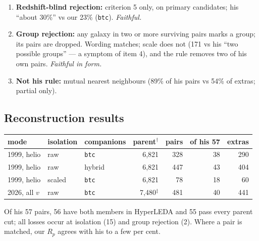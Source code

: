 \documentclass[11pt]{article}
\begin{document}
\begin{enumerate}
        textually supported choice and the funnel-faithful one
        (blind rate 23\%). The blockers of five of his pairs sit 0.01--0.09
        mag above the \texttt{btc} threshold, and three of those five
        (NGC 5916A, NGC 5169, UGC 11027) fall below it on raw \texttt{bt} ---
        so his blind search plausibly returned raw magnitudes for some
        objects. Raw \texttt{bt} everywhere recovers 40 but drops the blind
        rate to 7\%; a hybrid (\texttt{btc} for RC3 galaxies, raw otherwise)
        recovers 43 at 9\%. \emph{Status: inference, bracketed; \texttt{btc}
        is the default.}
  \item \textbf{Redshift-blind rejection:} criterion 5 only, on primary
        candidates; his ``about 30\%'' vs our 23\% (\texttt{btc}).
        \emph{Faithful.}
  \item \textbf{Group rejection:} any galaxy in two or more surviving pairs
        marks a group; its pairs are dropped. Wording matches; scale does not
        (171 vs his ``two possible groups'' --- a symptom of item 4), and the
        rule removes two of his own pairs. \emph{Faithful in form.}
  \item \textbf{Not his rule:} mutual nearest neighbours (89\% of his pairs
        vs 54\% of extras; partial only).
\end{enumerate}

\subsection{Reconstruction results}

\begin{center}
\begin{tabular}{lllrrrr}
\toprule
mode & isolation & companions & parent$^\dagger$ & pairs & of his 57 & extras \\
\midrule
1999, helio & raw    & \texttt{btc} & 6,821 & 328 & 38 & 290 \\
1999, helio & raw    & hybrid       & 6,821 & 447 & 43 & 404 \\
1999, helio & scaled & \texttt{btc} & 6,821 &  78 & 18 &  60 \\
2026, all $v$ & raw  & \texttt{btc} & 7,480$^\ddagger$ & 481 & 40 & 441 \\
\bottomrule
\end{tabular}
\end{center}

Of his 57 pairs, 56 have both members in HyperLEDA and 55 pass every parent
cut; all losses occur at isolation (15) and group rejection (2). Where a pair
is matched, our $R_p$ agrees with his to a few per cent.
\end{document}
